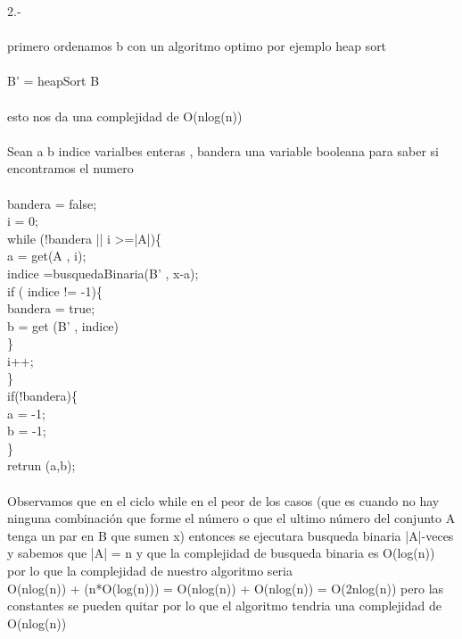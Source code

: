\documentclass{article}
\begin{document}
\begin{flushleft}
      
	2.-  \\ \ \\
	primero ordenamos b con un algoritmo optimo por ejemplo heap sort \\ \ \\
	B' = heapSort B\\ \ \\
	esto nos da una complejidad de O(nlog(n))\\ \ \\
	Sean a b indice varialbes enteras , bandera una variable booleana para saber si encontramos el numero\\ \ \\
	bandera = false;\\ 
	i = 0;\\ 
	while (!bandera || i >=|A|)\{\\ 
		\hspace{0.5cm}  a = get(A , i);\\
		\hspace{0.5cm} indice =busquedaBinaria(B' , x-a); \\ 
		\hspace{0.5cm} if ( indice != -1)\{\\ 
		\hspace{1cm} 	bandera = true;\\ 
		\hspace{1cm} 	b = get (B' , indice)\\ 
	\hspace{0.5cm} 	\}\\   
	\hspace{0.5cm} i++; \\ 
	\}\\
	if(!bandera)\{\\
	\hspace{0.5cm} a = -1; \\
	\hspace{0.5cm} b = -1; \\
	\}\\
	 retrun (a,b); \\ \ \\
	Observamos que en el ciclo while en el peor de los casos (que es cuando no hay ninguna combinación que forme el número o que el ultimo número del conjunto A tenga un par en B que sumen  
     	x) entonces se ejecutara busqueda binaria |A|-veces y sabemos que |A| = n y que la complejidad de busqueda binaria es  O(log(n)) por lo que la complejidad de nuestro algoritmo seria \\
	 O(nlog(n)) + (n*O(log(n))) =  O(nlog(n)) + O(nlog(n)) = O(2nlog(n)) pero las constantes se pueden quitar por lo que el algoritmo tendria una complejidad de  O(nlog(n))\\
	

\end{flushleft}
\end{document}
